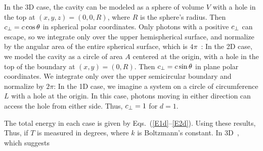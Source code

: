{	In the 3D case, the cavity can be modeled as a sphere of volume $V$ with a hole in the top at $(x, y, z) = (0, 0, R)$, where $R$ is the sphere's radius.  Then $c_\perp = c \cos\theta$ in spherical polar coordinates.  Only photons with a positive $c_\perp$ can escape, so we integrate only over the upper hemispherical surface, and normalize by the angular area of the entire spherical surface, which is $4\pi$~\cite[p.~169]{Kardar}:
	In the 2D case, we model the cavity as a circle of area $A$ centered at the origin, with a hole in the top of the boundary at $(x, y) = (0, R)$.  Then $c_\perp = c \sin\theta$ in plane polar coordinates.  We integrate only over the upper semicircular boundary and normalize by $2\pi$:
	In the 1D case, we imagine a system on a circle of circumference $L$ with a hole at the origin.  In this case, photons moving in either direction can access the hole from either side.  Thus, $c_\perp = 1$ for $d = 1$.
	
	The total energy in each case is given by Eqs.~(\ref{E1d}--\ref{E2d}).  Using these results,
	Thus, if $T$ is measured in degrees,
	where $k$ is Boltzmann's constant.  In 3D~\cite[p.~165]{Landau},
	which suggests
	\vfix
}

%
%



